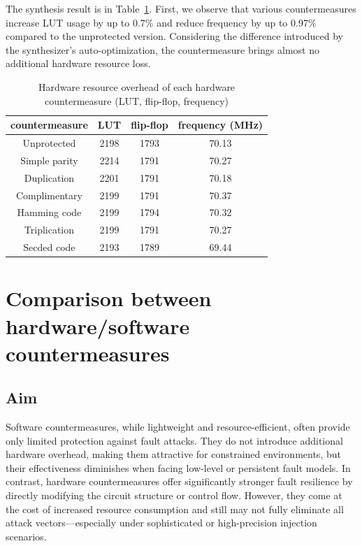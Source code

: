 The synthesis result is in Table~\ref{tab:countermeasures synthesis}. First, we observe that various countermeasures increase LUT usage by up to 0.7\% and reduce frequency by up to 0.97\% compared to the unprotected version. Considering the difference introduced by the synthesizer's auto-optimization, the countermeasure brings almost no additional hardware resource loss.

\begin{table}
    \centering
  \caption{Hardware resource overhead of each hardware countermeasure (LUT, flip-flop, frequency)}
  \label{tab:countermeasures synthesis}
\begin{tabular}{cccc}
\hline
countermeasure & LUT & flip-flop & frequency (MHz) \\
\hline
Unprotected & 2198 & 1793 & 70.13 \\
Simple parity & 2214 & 1791 & 70.27 \\
Duplication & 2201 & 1791 & 70.18 \\
Complimentary & 2199 & 1791 & 70.37 \\
Hamming code & 2199 & 1794 & 70.32 \\
Triplication & 2199 & 1791 & 70.27 \\
Secded code & 2193 & 1789 & 69.44 \\
\hline
\end{tabular}
\end{table}

\section{Comparison between hardware/software countermeasures}

\subsection{Aim}
Software countermeasures, while lightweight and resource-efficient, often provide only limited protection against fault attacks. They do not introduce additional hardware overhead, making them attractive for constrained environments, but their effectiveness diminishes when facing low-level or persistent fault models. In contrast, hardware countermeasures offer significantly stronger fault resilience by directly modifying the circuit structure or control flow. However, they come at the cost of increased resource consumption and still may not fully eliminate all attack vectors—especially under sophisticated or high-precision injection scenarios.

